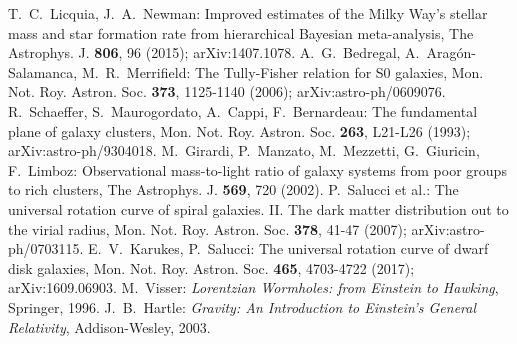 \documentclass{article}
\begin{document}
\begin{thebibliography}{99}
T.~C.~Licquia, J.~A.~Newman: Improved estimates of the Milky Way's stellar mass and star formation rate from hierarchical Bayesian meta-analysis, The Astrophys. J. \textbf{806}, 96 (2015); arXiv:1407.1078.
A.~G.~Bedregal, A.~Aragón-Salamanca, M.~R.~Merrifield: The Tully-Fisher relation for S0 galaxies, Mon. Not. Roy. Astron. Soc. \textbf{373}, 1125-1140 (2006); arXiv:astro-ph/0609076.
R.~Schaeffer, S.~Maurogordato, A.~Cappi, F.~Bernardeau: The fundamental plane of galaxy clusters, Mon. Not. Roy. Astron. Soc. \textbf{263}, L21-L26 (1993); arXiv:astro-ph/9304018.
M.~Girardi, P.~Manzato, M.~Mezzetti, G.~Giuricin, F.~Limboz: Observational mass-to-light ratio of galaxy systems from poor groups to rich clusters, The Astrophys. J. \textbf{569}, 720 (2002).
P.~Salucci et al.: The universal rotation curve of spiral galaxies. II. The dark matter distribution out to the virial radius, Mon. Not. Roy. Astron. Soc. \textbf{378}, 41-47 (2007); arXiv:astro-ph/0703115.
E.~V.~Karukes, P.~Salucci: The universal rotation curve of dwarf disk galaxies, Mon. Not. Roy. Astron. Soc. \textbf{465}, 4703-4722 (2017); arXiv:1609.06903.
M.~Visser: \emph{\it Lorentzian Wormholes: from Einstein to Hawking}, Springer, 1996.
J.~B.~Hartle: \emph{Gravity: An Introduction to Einstein's General Relativity}, Addison-Wesley, 2003.
\end{thebibliography}
\end{document}
